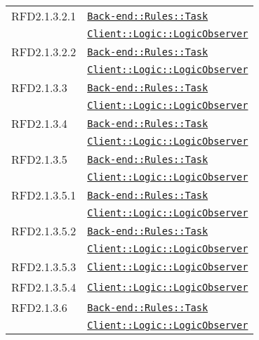 \begin{longtable}{|>{\centering}m{3cm}|m{10cm}<{\centering}|}
RFD2.1.3.2.1 & \hyperref[Back-end::Rules::Task]{\texttt{Back-end::Rules::Task}}\\
& \hyperref[Client::Logic::LogicObserver]{\texttt{Client::Logic::LogicObserver}}\\ \hline

RFD2.1.3.2.2 & \hyperref[Back-end::Rules::Task]{\texttt{Back-end::Rules::Task}}\\
& \hyperref[Client::Logic::LogicObserver]{\texttt{Client::Logic::LogicObserver}}\\ \hline

RFD2.1.3.3 & \hyperref[Back-end::Rules::Task]{\texttt{Back-end::Rules::Task}}\\
& \hyperref[Client::Logic::LogicObserver]{\texttt{Client::Logic::LogicObserver}}\\ \hline

RFD2.1.3.4 & \hyperref[Back-end::Rules::Task]{\texttt{Back-end::Rules::Task}}\\
& \hyperref[Client::Logic::LogicObserver]{\texttt{Client::Logic::LogicObserver}}\\ \hline

RFD2.1.3.5 & \hyperref[Back-end::Rules::Task]{\texttt{Back-end::Rules::Task}}\\
& \hyperref[Client::Logic::LogicObserver]{\texttt{Client::Logic::LogicObserver}}\\ \hline

RFD2.1.3.5.1 & \hyperref[Back-end::Rules::Task]{\texttt{Back-end::Rules::Task}}\\
& \hyperref[Client::Logic::LogicObserver]{\texttt{Client::Logic::LogicObserver}}\\ \hline

RFD2.1.3.5.2 & \hyperref[Back-end::Rules::Task]{\texttt{Back-end::Rules::Task}}\\
& \hyperref[Client::Logic::LogicObserver]{\texttt{Client::Logic::LogicObserver}}\\ \hline

RFD2.1.3.5.3 & \hyperref[Client::Logic::LogicObserver]{\texttt{Client::Logic::LogicObserver}}\\ \hline

RFD2.1.3.5.4 & \hyperref[Client::Logic::LogicObserver]{\texttt{Client::Logic::LogicObserver}}\\ \hline

RFD2.1.3.6 & \hyperref[Back-end::Rules::Task]{\texttt{Back-end::Rules::Task}}\\
& \hyperref[Client::Logic::LogicObserver]{\texttt{Client::Logic::LogicObserver}}\\ \hline


\end{longtable}
